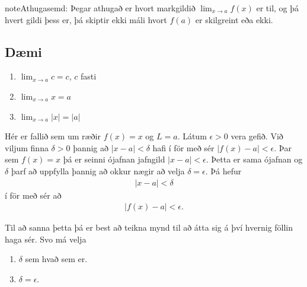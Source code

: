 \documentclass[a4paper,10pt,icelandic]{sphinxmanual}
\begin{document}
\begin{sphinxadmonition}{note}{Athugasemd:}
Þegar athugað er hvort markgildið \(\lim_{x\rightarrow a} f(x)\) er
til, og þá hvert gildi þess er, þá skiptir ekki máli hvort \(f(a)\) er
skilgreint eða ekki.
\end{sphinxadmonition}


\subsection{Dæmi}
\label{\detokenize{kafli02:daemi}}\label{\detokenize{kafli02:daemi2-1}}\begin{enumerate}
\item {} 
\(\lim_{x \to a} c = c\), \(c\) fasti

\item {} 
\(\lim_{x \to a} x = a\)

\item {} 
\(\lim_{x \to a} |x| = |a|\)

\end{enumerate}

Hér er fallið sem um ræðir \(f(x) = x\) og \(L=a\).
Látum \(\epsilon>0\) vera gefið. Við viljum finna
\(\delta >0\) þannig að \(|x-a|<\delta\) hafi í för
með sér \(|f(x)-a| < \epsilon\). Þar sem \(f(x)=x\) þá er seinni
ójafnan jafngild \(|x-a|<\epsilon\). Þetta er sama ójafnan og
\(\delta\) þarf að uppfylla þannig að okkur nægir að velja
\(\delta = \epsilon\). Þá hefur
\begin{equation*}
\begin{split}|x-a| < \delta\end{split}
\end{equation*}
í för með sér að
\begin{equation*}
\begin{split}|f(x) -a| < \epsilon.\end{split}
\end{equation*}

Til að sanna þetta þá er best að teikna mynd til að átta sig á því hvernig
föllin haga sér. Svo má velja
\begin{enumerate}
\item {} 
\(\delta\) sem hvað sem er.

\end{enumerate}
\begin{enumerate}
\setcounter{enumi}{2}
\item {} 
\(\delta=\epsilon\).

\end{enumerate}
\end{document}
